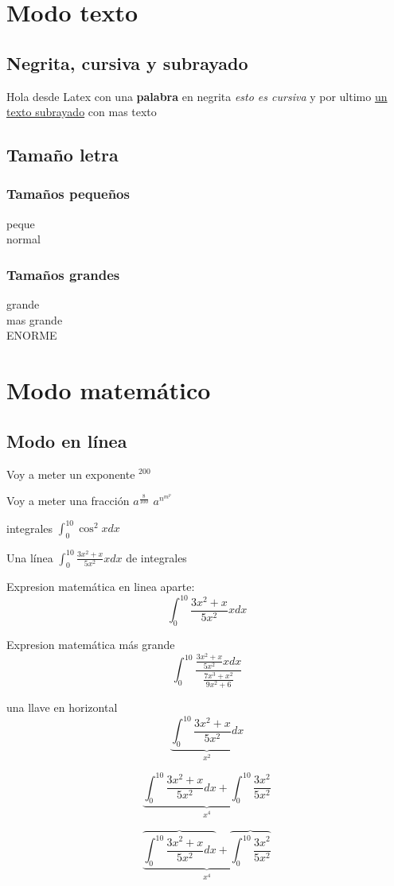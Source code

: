 \documentclass[10pt, a4paper]{report}
\begin{document}
\pagebreak
\tableofcontents
\pagebreak

\chapter{Modo texto}

\section{Negrita, cursiva y subrayado}

Hola desde Latex con
una {\bf palabra} en negrita
{\it esto es cursiva} y
por ultimo
\underline {un texto subrayado} con mas texto

\section{Tamaño letra}

\subsection{Tamaños pequeños}
{\tiny peque \\}
{\normalsize normal \\}
\subsection{Tamaños grandes}
{\large grande \\}
{\LARGE mas grande \\}
{\Huge ENORME \\}

\chapter{Modo matemático}

\section{Modo en línea}

Voy a meter un exponente $^{200} $

Voy a meter una fracción $ a^{\frac{8}{100}} $
$ a^{n^{m^{p}}} $

integrales $ \int_{0}^{10} \cos^2 x dx $

Una línea $ \int_{0}^{10} \frac{3x^2+x}{5x^2} x dx $ de integrales

Expresion matemática en linea aparte:
$$ \int_{0}^{10} \frac{3x^2+x}{5x^2} x dx $$

Expresion matemática más grande
$$ \int_{0}^{10} \frac{\frac{3x^2+x}{5x^2} x dx}{\frac{7x^3+x^2}{9x^2+6}} $$

una llave en horizontal
$$ \underbrace
		{
		\int_{0}^{10}
			\frac{3x^2+x}{5x^2}dx
		}
		_{x^2}
$$

$$\underbrace{ 
	\int_{0}^{10} 
		\frac{3x^2+x}{5x^2} dx 
	+ \int_{0}^{10} 
		\frac{3x^2}{5x^2}
	}_{x^4}
$$

$$\underbrace{ 
	\overbrace{
		\int_{0}^{10} 
			\frac{3x^2+x}{5x^2} dx
			}
			+
	\overbrace{ 
		 \int_{0}^{10} 
			\frac{3x^2}{5x^2}
			}
		}_{x^4}
$$
\end{document}
